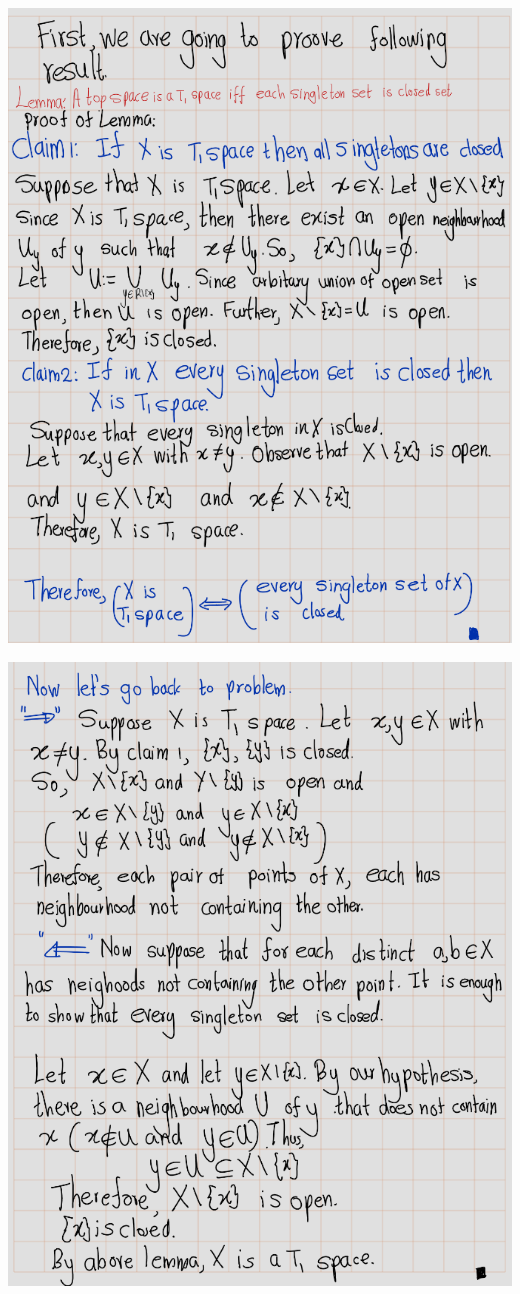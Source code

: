 \documentclass[
]{book}
\theoremstyle{definition}
\theoremstyle{definition}
\theoremstyle{definition}
\theoremstyle{definition}
\theoremstyle{remark}
\begin{document}
\includegraphics{figures/Exercises/Ex 2.17/ex-15-1.png}

\includegraphics{figures/Exercises/Ex 2.17/ex-15-2.png}
\end{document}
